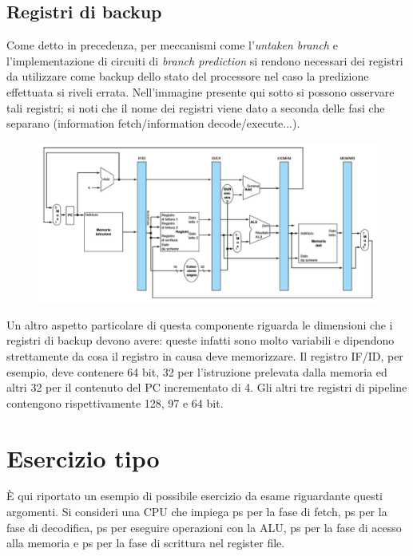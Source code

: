 \documentclass[class=book, crop=false, oneside]{standalone}
\begin{document}
\subsection{Registri di backup}
Come detto in precedenza, per meccanismi come l'\emph{untaken branch} e l'implementazione di circuiti di \emph{branch prediction} si rendono necessari dei registri da utilizzare come backup dello stato del processore nel caso la predizione effettuata si riveli errata. Nell'immagine presente qui sotto si possono osservare tali registri; si noti che il nome dei registri viene dato a seconda delle fasi che separano (information fetch/information decode/execute...).
\begin{figure}[H]
	\centering
	\includegraphics[width=\textwidth,keepaspectratio]{registri-di-backup.png}
\end{figure}
Un altro aspetto particolare di questa componente riguarda le dimensioni che i registri di backup devono avere: queste infatti sono molto variabili e dipendono strettamente da cosa il registro in causa deve memorizzare. Il registro IF/ID, per esempio, deve contenere 64 bit, 32 per l’istruzione prelevata dalla memoria ed altri 32 per il contenuto del PC incrementato di 4. Gli altri tre registri di pipeline contengono rispettivamente 128, 97 e 64 bit.

\section{Esercizio tipo}
È qui riportato un esempio di possibile esercizio da esame riguardante questi argomenti.
Si consideri una CPU che impiega \unit[600]{ps} per la fase di fetch, \unit[600]{ps} per la fase di decodifica, \unit[500]{ps} per eseguire operazioni con la ALU, \unit[400]{ps} per la fase di acesso alla memoria e \unit[700]{ps} per la fase di scrittura nel register file.
\end{document}
